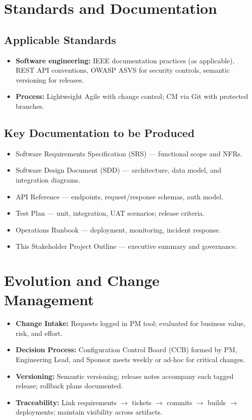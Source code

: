 \documentclass[12pt,a4paper]{article}
\begin{document}
\section{Standards and Documentation}

\subsection{Applicable Standards}
\begin{itemize}
\item \textbf{Software engineering:} IEEE documentation practices (as applicable), REST API conventions, OWASP ASVS for security controls, semantic versioning for releases.
\item \textbf{Process:} Lightweight Agile with change control; CM via Git with protected branches.
\end{itemize}

\subsection{Key Documentation to be Produced}
\begin{itemize}
\item Software Requirements Specification (SRS) --- functional scope and NFRs.
\item Software Design Document (SDD) --- architecture, data model, and integration diagrams.
\item API Reference --- endpoints, request/response schemas, auth model.
\item Test Plan --- unit, integration, UAT scenarios; release criteria.
\item Operations Runbook --- deployment, monitoring, incident response.
\item This Stakeholder Project Outline --- executive summary and governance.
\end{itemize}

\section{Evolution and Change Management}
\begin{itemize}
\item \textbf{Change Intake:} Requests logged in PM tool; evaluated for business value, risk, and effort.
\item \textbf{Decision Process:} Configuration Control Board (CCB) formed by PM, Engineering Lead, and Sponsor meets weekly or ad-hoc for critical changes.
\item \textbf{Versioning:} Semantic versioning; release notes accompany each tagged release; rollback plans documented.
\item \textbf{Traceability:} Link requirements $\rightarrow$ tickets $\rightarrow$ commits $\rightarrow$ builds $\rightarrow$ deployments; maintain visibility across artifacts.
\end{itemize}
\end{document}
